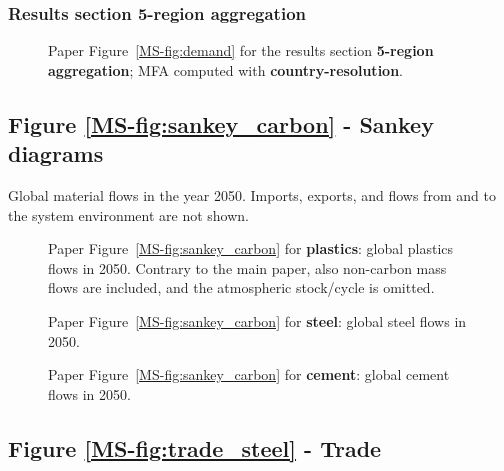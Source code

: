 \clearpage
\subsubsection{Results section 5-region aggregation}
\begin{figure}[htbp]
    \centering
    \caption{Paper Figure~\ref{MS-fig:demand} for the results section \textbf{5-region aggregation}; MFA computed with \textbf{country-resolution}.}
    \label{fig:figure_5_agg5_countries}
\end{figure}

\clearpage
\subsection{Figure \texorpdfstring{\ref{MS-fig:sankey_carbon}}{6} - Sankey diagrams} \label{sec:add_fig_6}

Global material flows in the year 2050.
Imports, exports, and flows from and to the system environment are not shown.

\begin{figure}[htbp]
    \centering
    \caption{Paper Figure~\ref{MS-fig:sankey_carbon} for \textbf{plastics}: global plastics flows in 2050. Contrary to the main paper, also non-carbon mass flows are included, and the atmospheric stock/cycle is omitted.}
    \label{fig:figure_6_plastics}
\end{figure}

\begin{figure}[htbp]
    \centering
    \caption{Paper Figure~\ref{MS-fig:sankey_carbon} for \textbf{steel}: global steel flows in 2050.}
    \label{fig:figure_6_steel}
\end{figure}

\begin{figure}[htbp]
    \centering
    \caption{Paper Figure~\ref{MS-fig:sankey_carbon} for \textbf{cement}: global cement flows in 2050.}
    \label{fig:figure_6_cement}
\end{figure}

\clearpage
\subsection{Figure \texorpdfstring{\ref{MS-fig:trade_steel}}{7} - Trade} \label{sec:add_fig_7}

